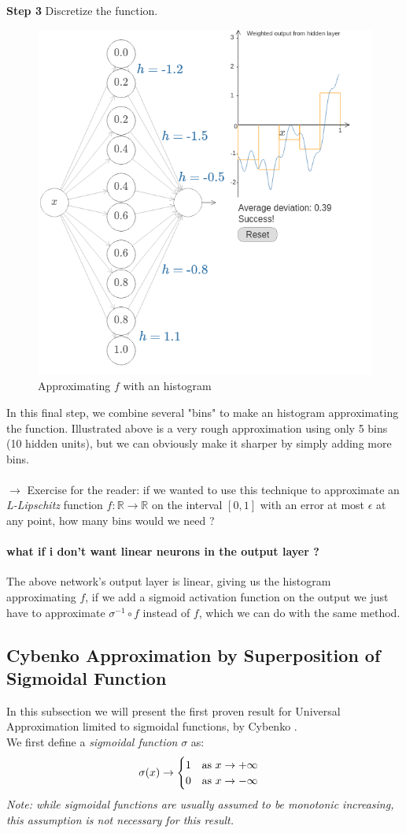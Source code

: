 \documentclass{article}
\begin{document}
\textbf{Step 3} Discretize the function.
\begin{figure}[H]
    \centering
    \includegraphics[width=.6\textwidth]{figures/discretize.png}
    \caption{Approximating $f$ with an histogram}
\end{figure}
In this final step, we combine several "bins" to make an histogram approximating the function. Illustrated above is a very rough approximation using only 5 bins (10 hidden units), but we can obviously make it sharper by simply adding more bins. \\\\
$\rightarrow$ Exercise for the reader: if we wanted to use this technique to approximate an \textit{L-Lipschitz} function $f: \mathbb{R} \rightarrow \mathbb{R}$ on the interval $[0, 1]$ with an error at most $\epsilon$ at any point, how many bins would we need ?  

\paragraph{what if i don't want linear neurons in the output layer ?}
The above network's output layer is linear, giving us the histogram approximating $f$, if we add a sigmoid activation function on the output  we just have to approximate $\sigma^{-1}\circ f$ instead of $f$, which we can do with the same method.

\subsection{Cybenko Approximation by Superposition of Sigmoidal Function}
In this subsection we will present the first proven result for Universal Approximation limited to sigmoidal functions, by Cybenko \cite{cybenko1989approximation}. \\
We first define a \textit{sigmoidal function} $\sigma$ as:
$$
\sigma(x) \to
\begin{cases}
1 \text{\quad as } x\to+\infty \\
0 \text{\quad as } x\to-\infty
\end{cases}
$$
\textit{Note: while sigmoidal functions are usually assumed to be monotonic increasing, this assumption is not necessary for this result.}
\end{document}
